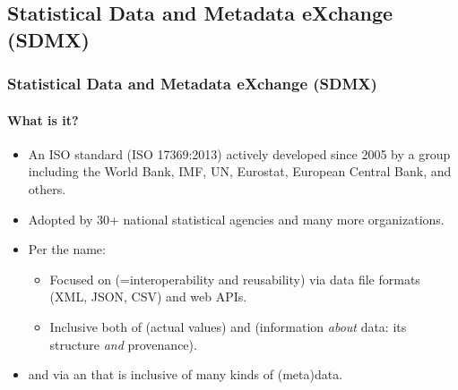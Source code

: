 \documentclass[12pt,aspectratio=169]{beamer}
\begin{document}
\subsection{Statistical Data and Metadata eXchange (SDMX)}

\begin{frame}
\frametitle{Statistical Data and Metadata eXchange (SDMX)}
\framesubtitle{What is it?}

\begin{itemize}
  \item An ISO standard (ISO 17369:2013) actively developed since 2005 by a group including the World Bank, IMF, UN, Eurostat, European Central Bank, and others.
  \item Adopted by 30+ national statistical agencies and many more organizations.
  \item Per the name:
    \begin{itemize}
      \item Focused on  (=interoperability and reusability) via data file formats (XML, JSON, CSV) and web APIs.
      \item Inclusive both of  (actual values) and  (information \emph{about} data: its structure \emph{and} provenance).
    \end{itemize}
  \item {} and  via an  that is inclusive of many kinds of (meta)data.
\end{itemize}
\end{frame}
\end{document}
